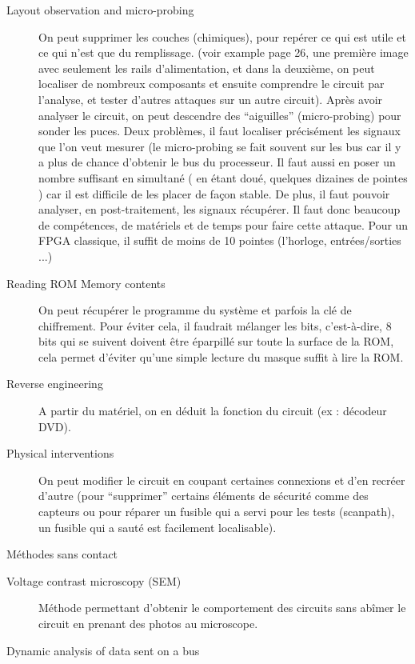 \documentclass[a4paper,12pt]{article}
\begin{document}
\begin{description}
\item[Layout observation and micro-probing] On peut supprimer les couches (chimiques), pour repérer ce qui est utile et ce qui n'est que du remplissage. (voir example page 26, une première image avec seulement les rails d'alimentation, et dans la deuxième, on peut localiser de nombreux composants et ensuite comprendre le circuit par l'analyse, et tester d'autres attaques sur un autre circuit). Après avoir analyser le circuit, on peut descendre des ``aiguilles'' (micro-probing) pour sonder les puces. Deux problèmes, il faut localiser précisément les signaux que l'on veut mesurer (le micro-probing se fait souvent sur les bus car il y a plus de chance d'obtenir le bus du processeur. Il faut aussi en poser un nombre suffisant en simultané ( en étant doué, quelques dizaines de pointes ) car il est difficile de les placer de façon stable. De plus, il faut pouvoir analyser, en post-traitement, les signaux récupérer. Il faut donc beaucoup de compétences, de matériels et de temps pour faire cette attaque. Pour un FPGA classique, il suffit de moins de 10 pointes (l'horloge, entrées/sorties ...)

\item[Reading ROM Memory contents] On peut récupérer le programme du système et parfois la clé de chiffrement. Pour éviter cela, il faudrait mélanger les bits, c'est-à-dire, 8 bits qui se suivent doivent être éparpillé sur toute la surface de la ROM, cela permet d'éviter qu'une simple lecture du masque suffit à lire la ROM.

\item[Reverse engineering] A partir du matériel, on en déduit la fonction du circuit (ex : décodeur DVD).

\item[Physical interventions] On peut modifier le circuit en coupant certaines connexions et d'en recréer d'autre (pour ``supprimer'' certains éléments de sécurité comme des capteurs ou pour réparer un fusible qui a servi pour les tests (scanpath), un fusible qui a sauté est facilement localisable).
\end{description}
\large{Méthodes sans contact}
\normalsize
\begin{description}
\item[Voltage contrast microscopy (SEM)] Méthode permettant d'obtenir le comportement des circuits sans abîmer le circuit en prenant des photos au microscope.
\item[Dynamic analysis of data sent on a bus]
\end{description}
\end{document}
